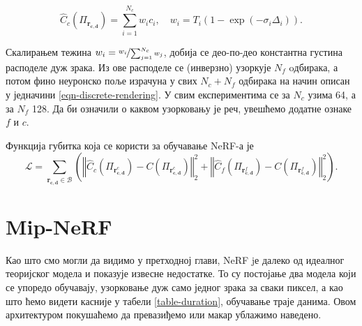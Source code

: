 \documentclass[12pt, a4paper, twoside]{book}
\numberwithin{equation}{chapter}
\numberwithin{theorem}{section}
\numberwithin{definition}{section}
\numberwithin{definitionChapter}{chapter}
\begin{document}
\begin{equation}
	\hat{C}_c(\Pi_{\mathbf{r_{c, d}}}) = \sum_{i=1}^{N_c}w_i c_i, \quad w_i = T_i (1- \exp(-\sigma_i\Delta_i)).
	\label{eqn-color-combination}
\end{equation}

Скалирањем тежина $w_i = \nicefrac{w_i}{\sum_{j=1}^{N_c}w_j}$, добија се део-по-део константна густина расподеле дуж зрака.
Из ове расподеле се (инверзно) узоркује $N_f$ oдбирака, а потом фино неуронско поље израчуна у свих
$N_c + N_f$ одбирака на начин описан у једначини \ref{eqn-discrete-rendering}. У свим експериментима се
за $N_c$ узима 64, а за $N_f$ 128. Да би означили о каквом узорковању је реч, увешћемо додатне ознаке
$f$ и $c$.

Функција губитка која се користи за обучавање NeRF-а је
\begin{equation}
	\mathcal{L} = \sum_{\mathbf{r_{c, d}} \in \mathcal{B}}
 	\left(
 	\left\Vert \hat{C}_c\left(\Pi_{\mathbf{r}^{c}_{\mathbf{c}, \mathbf{d}}}\right) -
 		C\left(\Pi_{\mathbf{r}^{c}_{\mathbf{c}, \mathbf{d}}}\right) \right\Vert^2_2 +
	\left\Vert \hat{C}_f\left(\Pi_{\mathbf{r}^{f}_{\mathbf{c}, \mathbf{d}}}\right) -
		C\left(\Pi_{\mathbf{r}^{f}_{\mathbf{c}, \mathbf{d}}}\right) \right\Vert^2_2
	\right).
	\label{eqn-nerf-loss}
\end{equation}

\section{Mip-NeRF}
Као што смо могли да видимо у претходној глави, NeRF jе далеко од идеалног теоријског модела и
показује извесне недостатке. То су постојање два модела који се упоредо обучавају, узорковање
дуж само једног зрака за сваки пиксел, а као што ћемо видети касније у табели \ref{table-duration},
обучавање траје данима. Овом архитектуром покушаћемо да превазиђемо или макар ублажимо наведено.
\end{document}
